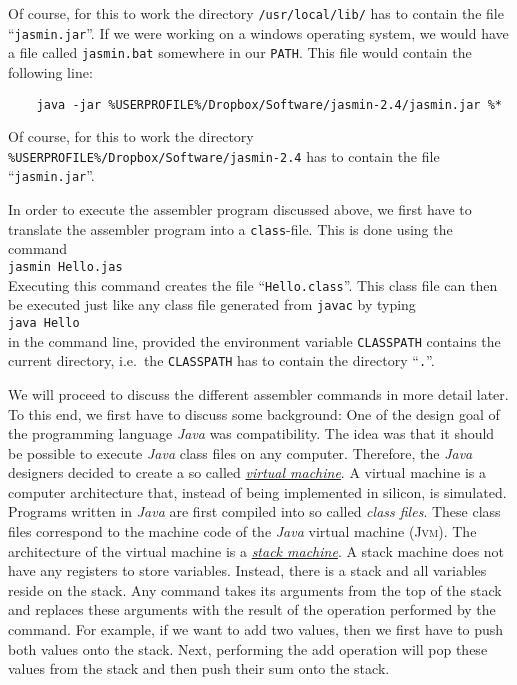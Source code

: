 Of course, for this to work the directory \texttt{/usr/local/lib/} has to contain the file
``\texttt{jasmin.jar}''.  If we were working on a windows operating system, we would have a file
called \texttt{jasmin.bat} somewhere in our \texttt{PATH}.  This file would contain the following
line:
\begin{verbatim}
    java -jar %USERPROFILE%/Dropbox/Software/jasmin-2.4/jasmin.jar %*
\end{verbatim}
Of course, for this to work the directory \texttt{\%USERPROFILE\%/Dropbox/Software/jasmin-2.4}
has to contain the file ``\texttt{jasmin.jar}''.

In order to execute the assembler program discussed above, we first have to translate the assembler
program into a \texttt{class}-file.  This is done using the command
\\[0.2cm]
\hspace*{1.3cm}
\texttt{jasmin Hello.jas}
\\[0.2cm]
Executing this command creates the file ``\texttt{Hello.class}''.  This class file
can then be executed just like any class file generated from \texttt{javac} by typing
\\[0.2cm]
\hspace*{1.3cm}
\texttt{java Hello}
\\[0.2cm]
in the command line, provided the environment variable \texttt{CLASSPATH} contains the current
directory, i.e.~the \texttt{CLASSPATH} has to contain the directory ``\texttt{.}''.

We will proceed to discuss the different assembler commands in more detail later.  To this end, we
first have to discuss some background: One of the design goal of the programming language
\textsl{Java} was compatibility.  The idea was 
that it should be possible to execute \textsl{Java} class files on any computer.  Therefore, the
\textsl{Java} designers decided to create a so called 
\href{http://en.wikipedia.org/wiki/Virtual_machine}{\emph{virtual machine}}.  A virtual machine is
a computer architecture that, instead of being implemented in silicon, is simulated. 
Programs written in \textsl{Java} are first compiled into so called \emph{class files}.  These class
files correspond to the machine code of the \textsl{Java} virtual machine (\textsc{Jvm}).  
The architecture of the virtual machine is a 
\href{http://en.wikipedia.org/wiki/Stack_machine}{\emph{stack machine}}. 
A stack machine does not have any registers to store variables.  Instead, there is a stack and all
variables reside on the stack.  Any command takes its arguments from the top of the stack and
replaces these arguments with the result of the operation performed by the command.
For example, if we want to add two values, then we first have to
push both values onto the stack.  Next, performing the add operation will pop these values from the
stack and then push their sum onto the stack.


